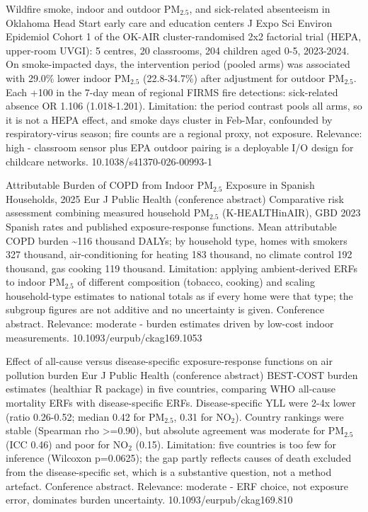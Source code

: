 \documentclass[10pt]{article}
\begin{document}
{Wildfire smoke, indoor and outdoor PM$_{2.5}$, and sick-related absenteeism in Oklahoma Head Start early care and education centers}
{J Expo Sci Environ Epidemiol}
{Cohort 1 of the OK-AIR cluster-randomised 2x2 factorial trial (HEPA, upper-room UVGI): 5 centres, 20 classrooms, 204 children aged 0-5, 2023-2024. On smoke-impacted days, the intervention period (pooled arms) was associated with 29.0\% lower indoor PM$_{2.5}$ (22.8-34.7\%) after adjustment for outdoor PM$_{2.5}$. Each +100 in the 7-day mean of regional FIRMS fire detections: sick-related absence OR 1.106 (1.018-1.201). Limitation: the period contrast pools all arms, so it is not a HEPA effect, and smoke days cluster in Feb-Mar, confounded by respiratory-virus season; fire counts are a regional proxy, not exposure. Relevance: high - classroom sensor plus EPA outdoor pairing is a deployable I/O design for childcare networks.}
{10.1038/s41370-026-00993-1}

\par{}\baselineskip{}\baselineskip
{}

{Attributable Burden of COPD from Indoor PM$_{2.5}$ Exposure in Spanish Households, 2025}
{Eur J Public Health (conference abstract)}
{Comparative risk assessment combining measured household PM$_{2.5}$ (K-HEALTHinAIR), GBD 2023 Spanish rates and published exposure-response functions. Mean attributable COPD burden \textasciitilde{}116 thousand DALYs; by household type, homes with smokers 327 thousand, air-conditioning for heating 183 thousand, no climate control 192 thousand, gas cooking 119 thousand. Limitation: applying ambient-derived ERFs to indoor PM$_{2.5}$ of different composition (tobacco, cooking) and scaling household-type estimates to national totals as if every home were that type; the subgroup figures are not additive and no uncertainty is given. Conference abstract. Relevance: moderate - burden estimates driven by low-cost indoor measurements.}
{10.1093/eurpub/ckag169.1053}

{Effect of all-cause versus disease-specific exposure-response functions on air pollution burden}
{Eur J Public Health (conference abstract)}
{BEST-COST burden estimates (healthiar R package) in five countries, comparing WHO all-cause mortality ERFs with disease-specific ERFs. Disease-specific YLL were 2-4x lower (ratio 0.26-0.52; median 0.42 for PM$_{2.5}$, 0.31 for NO$_2$). Country rankings were stable (Spearman rho >=0.90), but absolute agreement was moderate for PM$_{2.5}$ (ICC 0.46) and poor for NO$_2$ (0.15). Limitation: five countries is too few for inference (Wilcoxon p=0.0625); the gap partly reflects causes of death excluded from the disease-specific set, which is a substantive question, not a method artefact. Conference abstract. Relevance: moderate - ERF choice, not exposure error, dominates burden uncertainty.}
{10.1093/eurpub/ckag169.810}
\end{document}
